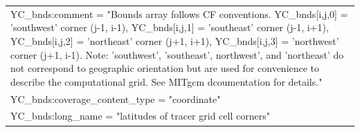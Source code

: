 \begin{longtable}{|p{\textwidth}|}
\rowcolor{Apricot}\hspace{0.5cm}\hspace{0.5cm}YC\_bnds:comment = "Bounds array follows CF conventions. YC\_bnds[i,j,0] = 'southwest' corner (j-1, i-1), YC\_bnds[i,j,1] = 'southeast' corner (j-1, i+1), YC\_bnds[i,j,2] = 'northeast' corner (j+1, i+1), YC\_bnds[i,j,3]  = 'northwest' corner (j+1, i-1). Note: 'southwest', 'southeast', northwest', and 'northeast' do not correspond to geographic orientation but are used for convenience to describe the computational grid. See MITgcm dcoumentation for details."\\
\rowcolor{Apricot}\hspace{0.5cm}\hspace{0.5cm}YC\_bnds:coverage\_content\_type = "coordinate"\\
\rowcolor{Apricot}\hspace{0.5cm}\hspace{0.5cm}YC\_bnds:long\_name = "latitudes of tracer grid cell corners"\\
\hline


\end{longtable}
